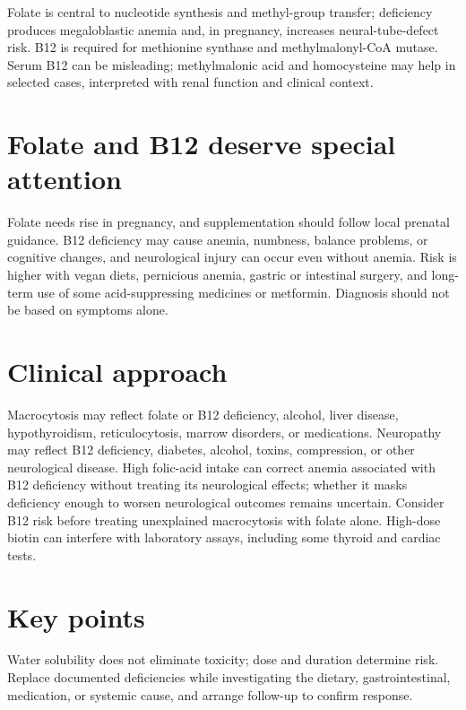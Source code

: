 Folate is central to nucleotide synthesis and methyl-group transfer; deficiency produces megaloblastic anemia and, in pregnancy, increases neural-tube-defect risk. B12 is required for methionine synthase and methylmalonyl-CoA mutase. Serum B12 can be misleading; methylmalonic acid and homocysteine may help in selected cases, interpreted with renal function and clinical context. \cite{odsB12,odsFolate}

\section{Folate and B12 deserve special attention}
Folate needs rise in pregnancy, and supplementation should follow local prenatal guidance. B12 deficiency may cause anemia, numbness, balance problems, or cognitive changes, and neurological injury can occur even without anemia. Risk is higher with vegan diets, pernicious anemia, gastric or intestinal surgery, and long-term use of some acid-suppressing medicines or metformin. Diagnosis should not be based on symptoms alone. \cite{odsFolate,odsB12}


\section{Clinical approach}
Macrocytosis may reflect folate or B12 deficiency, alcohol, liver disease, hypothyroidism, reticulocytosis, marrow disorders, or medications. Neuropathy may reflect B12 deficiency, diabetes, alcohol, toxins, compression, or other neurological disease. High folic-acid intake can correct anemia associated with B12 deficiency without treating its neurological effects; whether it masks deficiency enough to worsen neurological outcomes remains uncertain. Consider B12 risk before treating unexplained macrocytosis with folate alone. High-dose biotin can interfere with laboratory assays, including some thyroid and cardiac tests. \cite{odsFolate,odsB12,odsBiotin}

\section{Key points}
Water solubility does not eliminate toxicity; dose and duration determine risk. Replace documented deficiencies while investigating the dietary, gastrointestinal, medication, or systemic cause, and arrange follow-up to confirm response.
